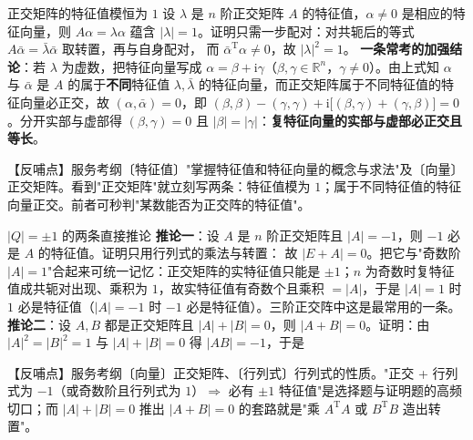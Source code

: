 \begin{fdeep}{正交矩阵的特征值模恒为 $1$}
设 $\lambda$ 是 $n$ 阶正交矩阵 $A$ 的特征值，$\alpha\ne0$ 是相应的特征向量，则 $A\alpha=\lambda\alpha$ 蕴含 $|\lambda|=1$。证明只需一步配对：对共轭后的等式 $A\bar\alpha=\bar\lambda\bar\alpha$ 取转置，再与自身配对，
而 $\bar\alpha^{\mathrm T}\alpha\ne0$，故 $|\lambda|^{2}=1$。
\textbf{一条常考的加强结论}：若 $\lambda$ 为虚数，把特征向量写成 $\alpha=\beta+\mathrm i\gamma$（$\beta,\gamma\in\mathbb R^{n}$，$\gamma\ne0$）。由上式知 $\alpha$ 与 $\bar\alpha$ 是 $A$ 的属于\textbf{不同}特征值 $\lambda,\bar\lambda$ 的特征向量，而正交矩阵属于不同特征值的特征向量必正交，故 $(\alpha,\bar\alpha)=0$，即 $(\beta,\beta)-(\gamma,\gamma)+\mathrm i\bigl[(\beta,\gamma)+(\gamma,\beta)\bigr]=0$。分开实部与虚部得 $(\beta,\gamma)=0$ 且 $|\beta|=|\gamma|$：\textbf{复特征向量的实部与虚部必正交且等长}。

【反哺点】服务考纲〔特征值〕"掌握特征值和特征向量的概念与求法"及〔向量〕正交矩阵。看到"正交矩阵"就立刻写两条：特征值模为 $1$；属于不同特征值的特征向量正交。前者可秒判"某数能否为正交阵的特征值"。
\end{fdeep}


\begin{fdeep}{$|Q|=\pm1$ 的两条直接推论}
\textbf{推论一}：设 $A$ 是 $n$ 阶正交矩阵且 $|A|=-1$，则 $-1$ 必是 $A$ 的特征值。证明只用行列式的乘法与转置：
故 $|E+A|=0$。把它与"奇数阶 $|A|=1$"合起来可统一记忆：正交矩阵的实特征值只能是 $\pm1$；$n$ 为奇数时复特征值成共轭对出现、乘积为 $1$，故实特征值有奇数个且乘积 $=|A|$，于是 $|A|=1$ 时 $1$ 必是特征值（$|A|=-1$ 时 $-1$ 必是特征值）。三阶正交阵中这是最常用的一条。
\textbf{推论二}：设 $A,B$ 都是正交矩阵且 $|A|+|B|=0$，则 $|A+B|=0$。证明：由 $|A|^{2}=|B|^{2}=1$ 与 $|A|+|B|=0$ 得 $|AB|=-1$，于是

【反哺点】服务考纲〔向量〕正交矩阵、〔行列式〕行列式的性质。"正交 + 行列式为 $-1$（或奇数阶且行列式为 $1$）$\Rightarrow$ 必有 $\pm1$ 特征值"是选择题与证明题的高频切口；而 $|A|+|B|=0$ 推出 $|A+B|=0$ 的套路就是"乘 $A^{\mathrm T}A$ 或 $B^{\mathrm T}B$ 造出转置"。
\end{fdeep}


